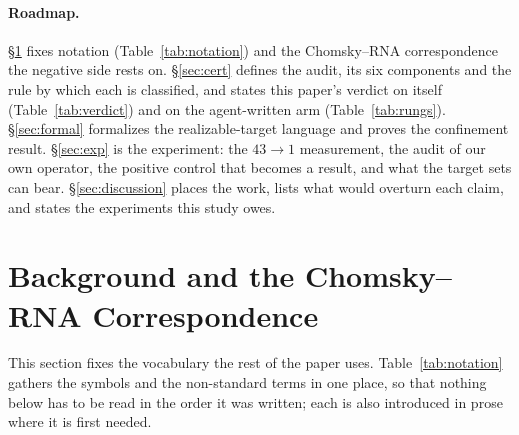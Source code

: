 \documentclass[11pt]{article}
\begin{document}
\paragraph{Roadmap.} \S\ref{sec:bg} fixes notation (Table~\ref{tab:notation}) and the Chomsky--RNA
correspondence the negative side rests on. \S\ref{sec:cert} defines the audit, its six components and the rule
by which each is classified, and states this paper's verdict on itself (Table~\ref{tab:verdict}) and on the
agent-written arm (Table~\ref{tab:rungs}). \S\ref{sec:formal} formalizes the realizable-target language and
proves the confinement result. \S\ref{sec:exp} is the experiment: the $43\!\to\!1$ measurement, the audit of
our own operator, the positive control that becomes a result, and what the target sets can bear.
\S\ref{sec:discussion} places the work, lists what would overturn each claim, and states the experiments this
study owes.

\section{Background and the Chomsky--RNA Correspondence}\label{sec:bg}
\noindent This section fixes the vocabulary the rest of the paper uses. Table~\ref{tab:notation} gathers the
symbols and the non-standard terms in one place, so that nothing below has to be read in the order it was
written; each is also introduced in prose where it is first needed.
\end{document}
